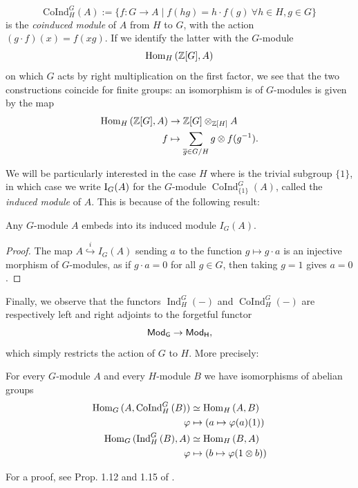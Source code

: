 \documentclass[a4paper, oneside]{memoir}
\begin{document}
\[
	\mathrm{CoInd}^G_H{(A)}:=\{f:G\to A \mid f(hg)=h\cdot f(g) ~\forall h\in H, g\in G\}
\]
is the \textit{coinduced module} of $A$ from $H$ to $G$, with the action $(g \cdot f)(x)=f(xg)$. If we identify the latter with the $G$-module
\[
	\operatorname{Hom}_H{(\mathbb{Z}[G],A)}
\]
on which $G$ acts by right multiplication on the first factor, we see that the two constructions coincide for finite groups: an isomorphism is of $G$-modules is given by the map
\begin{equation}\label{eq:IndIso}
	\begin{aligned}
		\operatorname{Hom}_H{(\mathbb{Z}[G],A)} & \to \mathbb{Z}[G]\otimes_{\mathbb{Z}[H]}{A}                               \\
		f                 & \mapsto \sum_{\overline{g} \in G / H}{g\otimes f(g^{-1})}.
	\end{aligned}
\end{equation}

We will be particularly interested in the case $H$ where is the trivial subgroup $\{1\}$, in which case we write $\operatorname{I}_{G}(A)$ for the $G$-module $\operatorname{CoInd}^G_{\{1\}}{(A)}$, called the \textit{induced module} of $A$. This is because of the following result:

\begin{proposition}
	Any $G$-module $A$ embeds into its induced module $I_G(A)$.
\end{proposition}

\begin{proof}
	The map $A\overset{i}{\hookrightarrow} I_G(A)$ sending $a$ to the function $g\mapsto g\cdot a$ is an injective morphism of $G$-modules, as if $g\cdot a = 0 $ for all $g\in G$, then taking $g=1$ gives $a=0$.
\end{proof}

\noindent Finally, we observe that the functors $\operatorname{Ind}^G_H{(-)}$ and $\operatorname{CoInd}^G_H{(-)}$ are respectively left and right adjoints to the forgetful functor
\[
	\mathsf{Mod}_\mathsf{G}\to\mathsf{Mod}_\mathsf{H},
\]
which simply restricts the action of $G$ to $H$. More precisely:

\begin{proposition}
	For every $G$-module $A$ and every $H$-module $B$ we have isomorphisms of abelian groups
	\begin{align}
		\operatorname{Hom}_G{(A,\operatorname{CoInd}^G_H{(B)})} & \simeq \operatorname{Hom}_H{(A,B)}\label{eq:CoIndAdj}                    \\
		\varphi                                   & \mapsto (a\mapsto \varphi(a)(1)) \nonumber                 \\
		\operatorname{Hom}_G{(\operatorname{Ind}^G_H{(B)},A)}   & \simeq \operatorname{Hom}_H{(B,A)}\label{eq:IndAdj}                      \\
		\varphi                                   & \mapsto \left(b\mapsto \varphi(1\otimes b)\right)\nonumber
	\end{align}
\end{proposition}
\noindent For a proof, see Prop. 1.12 and 1.15 of \cite{Harari}.
\end{document}
